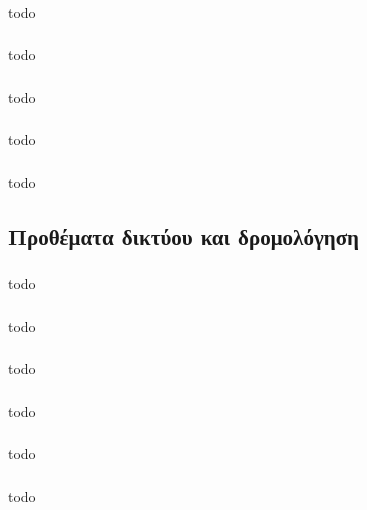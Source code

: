 \documentclass[a4paper, 12pt]{article}
\begin{document}
		\subsubsection{}
			todo

		\subsubsection{}
			todo

		\subsubsection{}
			todo

		\subsubsection{}
			todo

		\subsubsection{}
			todo

	\subsection{Προθέματα δικτύου και δρομολόγηση}

		\subsubsection{}
			todo

		\subsubsection{}
			todo

		\subsubsection{}
			todo

		\subsubsection{}
			todo

		\subsubsection{}
			todo

		\subsubsection{}
			todo
\end{document}
